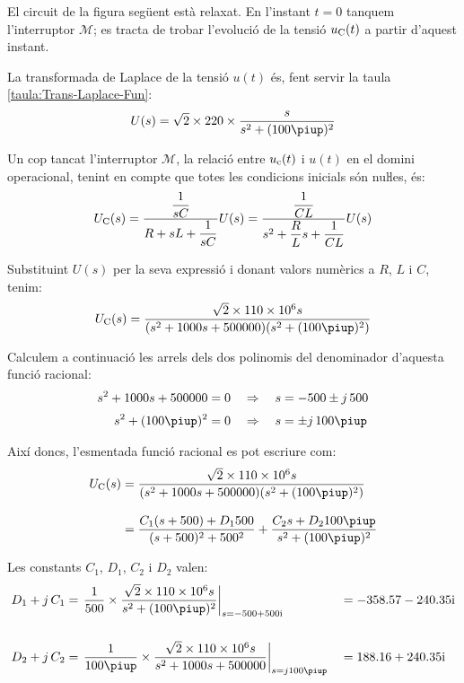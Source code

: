 \break	
\begin{exemple}\label{ex:CircuitLaplaceNul}	
	\addcontentsxms{\CircuitLaplaceNul}
    El circuit de la figura següent està relaxat. En l'instant $t=0$
    tanquem l'interruptor $\mathscr{M}$; es tracta de trobar l'evolució de la tensió
    $u_\mathrm{C}(t)$ a partir d'aquest instant.

    \begin{center}
        
    \end{center}

    La transformada de Laplace de la tensió $u(t)$ és, fent servir la taula \ref{taula:Trans-Laplace-Fun}:
    \[
        U(s) = \sqrt{2}\times 220\times \frac{s}{s^2 + (100\piup)^2}
    \]

    Un cop tancat l'interruptor $\mathscr{M}$, la relació entre $u_\mathrm{c}(t)$ i
    $u(t)$ en el domini operacional, tenint en compte que totes les
    condicions inicials són nuŀles, és:
    \[
        U_\mathrm{C}(s) = \frac{\dfrac{1}{sC}}{R+ sL +\dfrac{1}{sC}} U(s)=
        \frac{\dfrac{1}{CL}}{s^2 + \dfrac{R}{L}s +\dfrac{1}{CL}} U(s)
    \]

    Substituint $U(s)$ per la seva expressió i donant valors numèrics a
    $R$, $L$ i $C$, tenim:
    \[
        U\ped{C}(s) = \frac{\sqrt{2}\times 110\times 10^6 s}{(s^2 + 1000 s + 500000)(s^2 + (100\piup)^2)}
    \]

    Calculem a continuació les arrels dels dos polinomis  del
    denominador d'aquesta funció racional:
    \begin{align*}
        s^2 + 1000 s + 500000 &= 0 \quad\Rightarrow\quad s = -500
        \pm j\,500 \\[0.5ex]
        s^2 + (100\piup)^2 &= 0 \quad\Rightarrow\quad s = \pm j\,100\piup
    \end{align*}

    Així doncs, l'esmentada funció racional es pot escriure com:
    \[\begin{split}
    U\ped{C}(s) &= \frac{\sqrt{2}\times 110\times 10^6 s}{(s^2 + 1000 s +
    500000)(s^2 + (100\piup)^2)}   \\[2ex] &= \frac{C_1 (s+500) + D_1
    500}{(s+500)^2+500^2} + \frac{C_2 s + D_2 100 \piup}{s^2 +(100\piup)^2}
    \end{split}\]

    Les constants $C_1$, $D_1$,  $C_2$ i $D_2$ valen:
    \begin{alignat*}{2}
        D_1 + j\,C_1 &= \left.\frac{1}{500}\times \frac{\sqrt{2}\times 110\times 10^6 s}
        {s^2 +(100\piup)^2}\right|_{s=\complexnum{-500+j500}} &&= \complexnum{-358,57 -j 240,35}\\[3.5ex]
        D_2 + j\,C_2 &= \left.\frac{1}{100\piup}\times\frac{\sqrt{2}\times 110\times 10^6 s}
        {s^2 + 1000 s + 500000}\right|_{s=j 100\piup} &&= \complexnum{188,16 + j240,35}
    \end{alignat*}


\end{exemple}
